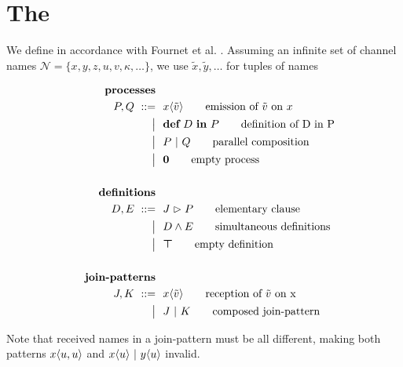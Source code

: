 \section{The \JoinCalc}



We define \joincalc in accordance with Fournet et al.
\cite{fournet_calculus_1996}.
Assuming an infinite set of channel names
$ \mathcal{N} = \{ x, y, z, u, v, \kappa, \ldots \} $,
we use
$ \tilde{x}, \tilde{y}, \ldots $
for tuples of names

\begin{align}
  \tag*{\textbf{processes}}
  \\
  P, Q
  \grmr \jsnd{x}{\tilde{v}}   \tag*{emission of $\tilde{v}$ on $x$}
  \altn \nonumber \jdef{D}{P} \tag*{definition of D in P}
  \altn P \jpar Q             \tag*{parallel composition}
  \altn \jnullproc            \tag*{empty process}
  \\ \nonumber
  \\
  \tag*{\textbf{definitions}}
  \\
  D, E
  \grmr \jrct{J}{P} \tag*{elementary clause}
  \altn D \jcon E   \tag*{simultaneous definitions}
  \altn \jnulldef   \tag*{empty definition}
  \\ \nonumber
  \\
  \tag*{\textbf{join-patterns}}
  \\
  J, K
  \grmr \jrcv{x}{\tilde{v}} \tag*{reception of $\tilde{v}$ on x}
  \altn J \jpat K           \tag*{composed join-pattern}
\end{align}

Note that received names in a join-pattern must be all different,
making both patterns
$ x\langle u,u\rangle $ and
$ x\langle u\rangle \ |\  y\langle u\rangle $
invalid.



